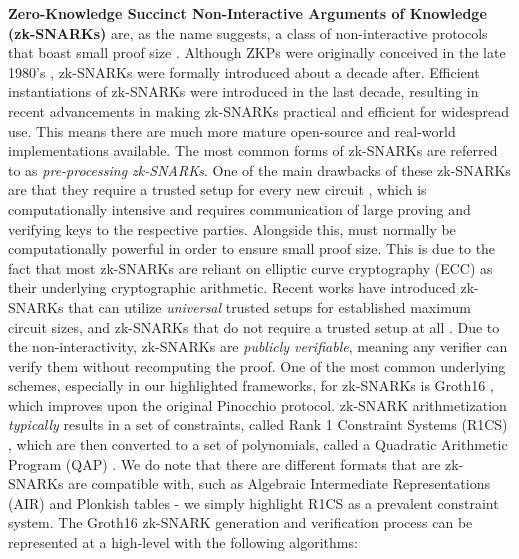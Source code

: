 \textbf{Zero-Knowledge Succinct Non-Interactive Arguments of Knowledge (zk-SNARKs)} are, as the name suggests, a class of non-interactive protocols that boast small proof size \cite{ben2014succinct}. Although ZKPs were originally conceived in the late 1980's \cite{goldwasser2019knowledge}, zk-SNARKs were formally introduced about a decade after. Efficient instantiations of zk-SNARKs were introduced in the last decade, resulting in recent advancements in making zk-SNARKs practical and efficient for widespread use. 
This means there are much more mature open-source and real-world implementations available. The most common forms of zk-SNARKs are referred to as \textit{pre-processing zk-SNARKs}. One of the main drawbacks of these zk-SNARKs are that they require a trusted setup for every new circuit \Cir, which is computationally intensive and requires communication of large proving and verifying keys to the respective parties. 
Alongside this, \Prv must normally be computationally powerful in order to ensure small proof size. This is due to the fact that most zk-SNARKs are reliant on elliptic curve cryptography (ECC) as their underlying cryptographic arithmetic.
Recent works have introduced zk-SNARKs that can utilize \textit{universal} trusted setups \cite{plonk, chiesa2020marlin} for established maximum circuit sizes, and zk-SNARKs that do not require a trusted setup at all \cite{setty2020spartan, wahby2018doubly}. 
Due to the non-interactivity, zk-SNARKs are \textit{publicly verifiable}, meaning any verifier can verify them without recomputing the proof. One of the most common underlying schemes, especially in our highlighted frameworks, for zk-SNARKs is Groth16 \cite{groth16}, which improves upon the original Pinocchio \cite{parno2016pinocchio} protocol. zk-SNARK arithmetization \textit{typically} results in a set of constraints, called Rank 1 Constraint Systems (R1CS) \cite{belles2022circom}, which are then converted to a set of polynomials, called a Quadratic Arithmetic Program (QAP) \cite{gennaro2013quadratic}. We do note that there are different formats that are zk-SNARKs are compatible with, such as Algebraic Intermediate Representations (AIR) \cite{ben2018scalable} and Plonkish tables - we simply highlight R1CS as a prevalent constraint system. The Groth16 zk-SNARK generation and verification process can be represented at a high-level with the following algorithms:
